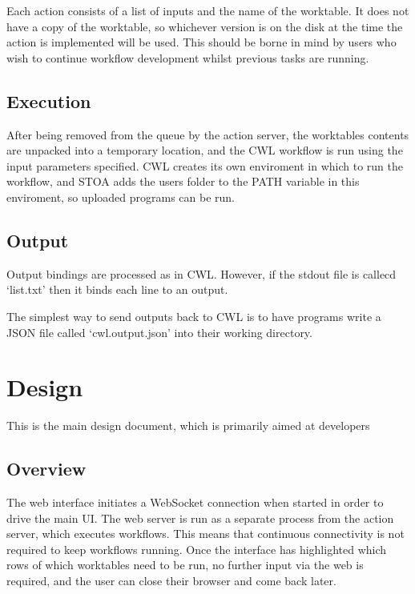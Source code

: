 \documentclass[letterpaper,10pt,english]{sphinxmanual}
\begin{document}
Each action consists of a list of inputs and the name of the worktable. It does not have a copy of the worktable, so whichever version is on the disk at the time the action is implemented will be used. This should be borne in mind by users who wish to continue workflow development whilst previous tasks are running.


\section{Execution}
\label{\detokenize{process:execution}}
After being removed from the queue by the action server, the worktables contents are unpacked into a temporary location, and the CWL workflow is run using the input parameters specified. CWL creates its own enviroment in which to run the workflow, and STOA adds the users folder to the PATH variable in this enviroment, so uploaded programs can be run.


\section{Output}
\label{\detokenize{process:output}}
Output bindings are processed as in CWL. However, if the stdout file is callecd ‘list.txt’ then it binds each line to an output.

The simplest way to send outputs back to CWL is to have programs write a JSON file called ‘cwl.output.json’ into their working directory.


\chapter{Design}
\label{\detokenize{design:design}}\label{\detokenize{design::doc}}
This is the main design document, which is primarily aimed at developers


\section{Overview}
\label{\detokenize{design:overview}}
\noindent{}

The web interface initiates a WebSocket connection when started in order to drive the main UI. The web server is run as a separate process from the action server, which executes workflows. This means that continuous connectivity is not required to keep workflows running. Once the interface has highlighted which rows of which worktables need to be run, no further input via the web is required, and the user can close their browser and come back later.
\end{document}
